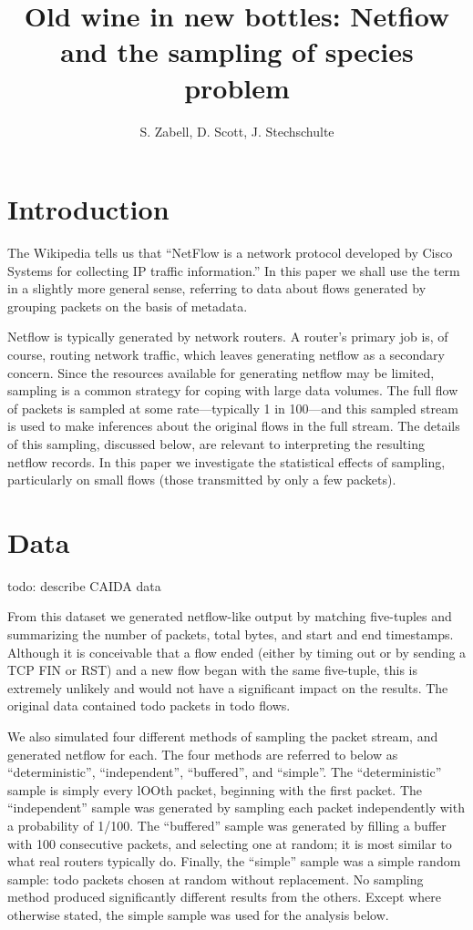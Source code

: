 \documentclass{paper}
\title{Old wine in new bottles: Netfiow and the sampling of species problem}
\author{S. Zabell, D. Scott, J. Stechschulte}
\begin{document}
\maketitle

\section{Introduction}
The Wikipedia tells us that ``NetFlow is a network protocol developed by Cisco
Systems for collecting IP traffic information.'' In this paper we shall use the
term in a slightly more general sense, referring to data about flows generated
by grouping packets on the basis of metadata.

Netflow is typically generated by network routers. A router's primary job is,
of course, routing network traffic, which leaves generating netflow as a
secondary concern. Since the resources available for generating netflow may be
limited, sampling is a common strategy for coping with large data volumes. The
full flow of packets is sampled at some rate---typically 1 in 100---and this
sampled stream is used to make inferences about the original flows in the full
stream. The details of this sampling, discussed below, are relevant to
interpreting the resulting netflow records. In this paper we investigate the
statistical effects of sampling, particularly on small flows (those transmitted
by only a few packets).

\section{Data}
todo: describe CAIDA data

From this dataset we generated netflow-like output by matching five-tuples and
summarizing the number of packets, total bytes, and start and end timestamps.
Although it is conceivable that a flow ended (either by timing out or by
sending a TCP FIN or RST) and a new flow began with the same five-tuple, this
is extremely unlikely and would not have a significant impact on the results.
The original data contained todo packets in todo flows.

We also simulated four different methods of sampling the packet stream, and
generated netflow for each. The four methods are referred to below as
``deterministic'', ``independent'', ``buffered'', and ``simple''. The
``deterministic'' sample is simply every lOOth packet, beginning with the first
packet. The ``independent'' sample was generated by sampling each packet
independently with a probability of 1/100. The ``buffered'' sample was
generated by filling a buffer with 100 consecutive packets, and selecting one
at random; it is most similar to what real routers typically do. Finally, the
``simple'' sample was a simple random sample: todo packets chosen at random
without replacement. No sampling method produced significantly different
results from the others. Except where otherwise stated, the simple sample was
used for the analysis below.
\end{document}
